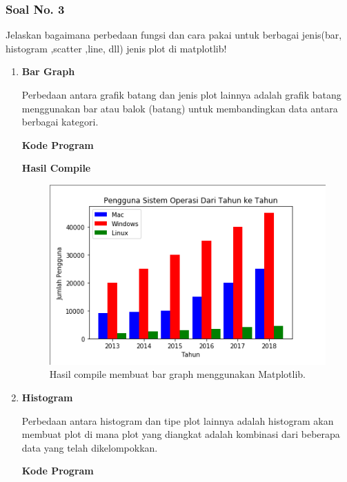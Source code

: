 \subsubsection{Soal No. 3}
\hfill \break
Jelaskan bagaimana perbedaan fungsi dan cara pakai untuk berbagai jenis(bar, histogram ,scatter ,line, dll) jenis plot di matplotlib!

\begin{enumerate}
	\item \textbf{Bar Graph}
	
	Perbedaan antara grafik batang dan jenis plot lainnya adalah grafik batang menggunakan bar atau balok (batang) untuk membandingkan data antara berbagai kategori.
	
	\textbf{Kode Program}
	
	
	
	\textbf{Hasil Compile}
	
	\begin{figure}[H]
		\includegraphics[width=12cm]{figures/6/1174017/bar.png}
		\centering
		\caption{Hasil compile membuat bar graph menggunakan Matplotlib.}
	\end{figure}
	
	\item \textbf{Histogram}
	
	Perbedaan antara histogram dan tipe plot lainnya adalah histogram akan membuat plot di mana plot yang diangkat adalah kombinasi dari beberapa data yang telah dikelompokkan.
	
	\textbf{Kode Program}
	
	
	

\end{enumerate}
